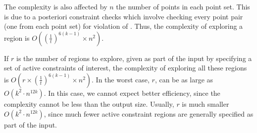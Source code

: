 The complexity is also affected by $n$ the number of points in each point set.
This is due to a posteriori constraint checks which involve checking every point
pair (one from each point set) for violation of \cone. Thus, the complexity of 
exploring a region is $O((\frac{1}{t})^{6(k-1)} \times n^2)$.

If $r$ is the number of regions to explore, given as part of the input by 
specifying a set of active constraints of interest, the complexity of exploring 
all these regions is $O(r \times (\frac{1}{t})^{6(k-1)} \times n^2)$.
In the worst case, $r$, can be as large as $O(k^2 \cdot n^{12k})$. 
In this case, we cannot expect better efficiency, since the complexity cannot be 
less than the output size. Usually, $r$ is much smaller $O(k^2 \cdot n^{12k})$, since much 
fewer active constraint regions are generally specified as part of the input.









